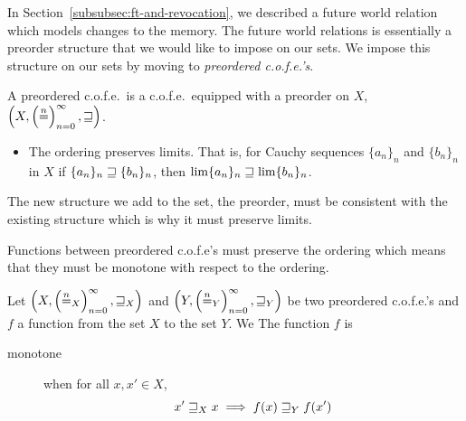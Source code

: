 \begin{jversion}
In Section~\ref{subsubsec:ft-and-revocation}, we described a future world relation which models changes to the memory.
The future world relations is essentially a preorder structure that we would like to impose on our sets.
We impose this structure on our sets by moving to \emph{preordered c.o.f.e.'s}.
\begin{definition}[Preordered c.o.f.e.]
  A preordered c.o.f.e.\ is a c.o.f.e.\ equipped with a preorder on $X$, $\left(X, \left(\nequal\right)_{n=0}^{\infty}, \future \right)$. 
  \begin{itemize}
  \item The ordering preserves limits. That is, for Cauchy sequences $\{a_n\}_n$ and $\{b_n\}_n$ in $X$ if $\{a_n\}_n \future\{b_n\}_n$, then $\lim \{a_n\}_n \future \lim \{b_n\}_n$.
  \end{itemize}
\end{definition}
The new structure we add to the set, the preorder, must be consistent with the existing structure which is why it must preserve limits.

Functions between preordered c.o.f.e's must preserve the ordering which means that they must be monotone with respect to the ordering.
\begin{lemma}
  \label{def:monotone-preordered-cofe}
  Let $\left(X,\left(\nequal[n]_X\right)_{n=0}^{\infty},\future_X \right)$ and $\left(Y,\left(\nequal[n]_Y\right)_{n=0}^{\infty} ,\future_Y\right)$ be two preordered c.o.f.e.'s and $f$ a function from the set $X$ to the set $Y$.
  We 
  The function $f$ is
  \begin{description}
  \item[monotone] when for all $x, x' \in X$,
\[
  x' \future_X x \implies f(x) \future_Y f(x')
\]
  \end{description}
\end{lemma}


\end{jversion}
